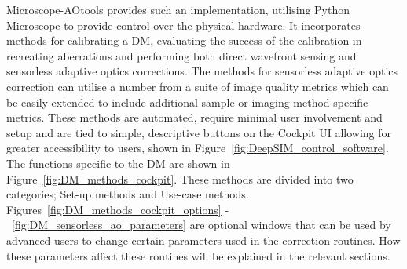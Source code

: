 Microscope-AOtools provides such an implementation, utilising Python Microscope to provide control over the physical hardware. It incorporates methods for calibrating a DM, evaluating the success of the calibration in recreating aberrations and performing both direct wavefront sensing and sensorless adaptive optics corrections. The methods for sensorless adaptive optics correction can utilise a number from a suite of image quality metrics which can be easily extended to include additional sample or imaging method-specific metrics. These methods are automated, require minimal user involvement and setup and are tied to simple, descriptive  buttons on the Cockpit UI allowing for greater accessibility to users, shown in Figure~\ref{fig:DeepSIM_control_software}. The functions specific to the DM are shown in Figure~\ref{fig:DM_methods_cockpit}. These methods are divided into two categories; Set-up methods and Use-case methods. Figures~\ref{fig:DM_methods_cockpit_options} -~\ref{fig:DM_sensorless_ao_parameters} are optional windows that can be used by advanced users to change certain parameters used in the correction routines. How these parameters affect these routines will be explained in the relevant sections.

